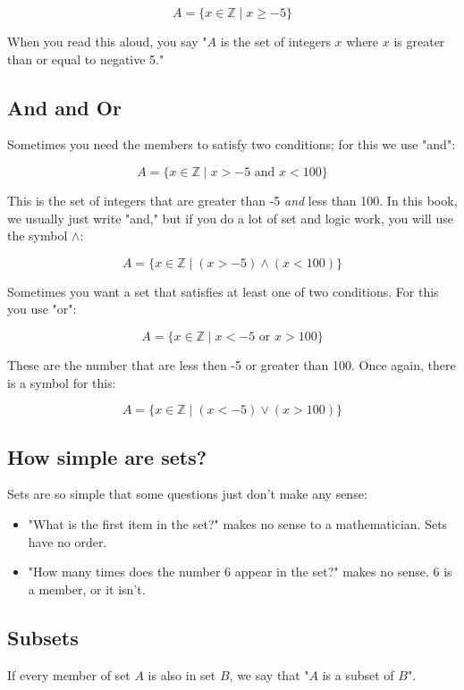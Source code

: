 $$A = \{ x \in \mathbb{Z} \mid x \geq -5 \}$$

When you read this aloud, you say "$A$ is the set of integers $x$
where $x$ is greater than or equal to negative 5."

\subsection{And and Or}


Sometimes you need the members to satisfy two conditions; for this we
use "and": 

$$A = \{ x \in \mathbb{Z} \mid x > -5 \text{ and }  x < 100\}$$

This is the set of integers that are greater than -5 \textit{and} less
than 100.  In this book, we usually just write "and," but if you do a
lot of set and logic work, you will use the symbol $\land$:

$$A = \{ x \in \mathbb{Z} \mid (x > -5) \land (x < 100)\}$$

Sometimes you want a set that satisfies at least one of two
conditions.  For this you use "or":

$$A = \{ x \in \mathbb{Z} \mid x < -5 \text{ or } x > 100\}$$

These are the number that are less then -5 or greater than 100.  Once
again, there is a symbol for this:

$$A = \{ x \in \mathbb{Z} \mid (x < -5) \lor (x > 100)\}$$

\subsection{How simple are sets?}

Sets are so simple that some questions just don't make any sense:
\begin{itemize}
\item "What is the first item in the set?" makes no sense to a mathematician.  Sets have no order.
\item "How many times does the number 6 appear in the set?"  makes no sense.   6 is a member, or it isn't.   
\end{itemize}

\subsection{Subsets}

If every member of set $A$ is also in set $B$, we say that "$A$ is a
subset of $B$". 

